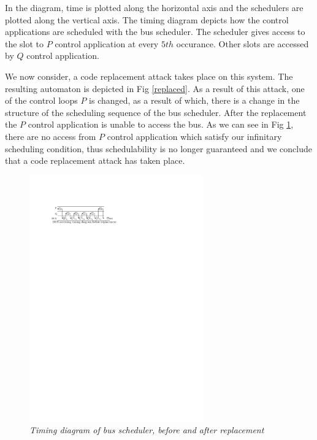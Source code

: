 In the diagram, time is plotted along the horizontal axis and the schedulers are plotted along the vertical axis. The timing diagram depicts how the control
applications are scheduled with the bus scheduler. The scheduler gives access to the slot to $P$ control application at every $5th$ occurance. Other slots 
are accessed by $Q$ control application. 


\noindent
We now consider, a code replacement attack takes place on this system. The resulting automaton is depicted in Fig \ref{replaced}.
As a result of this attack, one of the control loops $P$ is changed, as a result of which, there is a change in the structure of the scheduling sequence of the bus scheduler. 
After the replacement the $P$ control application is unable to access the bus.  As we can see in Fig \ref{state-transition},
there are no access from $P$ control application which satisfy our infinitary scheduling condition,
thus schedulability is no longer guaranteed and we conclude that a code replacement attack has taken place.

\begin{figure}
\begin{center}
\includegraphics[width= 75mm]{bus_timing_diagram.pdf}
\end{center}
\caption{{\em Timing diagram of bus scheduler, before and after replacement}}
\label{state-transition}
\end{figure}

